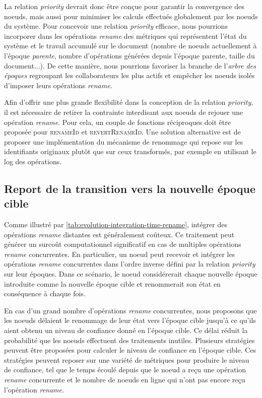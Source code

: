 \documentclass[12pt]{thesul}
\begin{document}
La relation \emph{priority} devrait donc être conçue pour garantir la convergence des noeuds, mais aussi pour minimiser les calculs effectués globalement par les noeuds du système.
Pour concevoir une relation \emph{priority} efficace, nous pourrions incorporer dans les opérations \emph{rename} des métriques qui représentent l'état du système et le travail accumulé sur le document (nombre de noeuds actuellement à l'époque \emph{parente}, nombre d'opérations générées depuis l'époque parente, taille du document...).
De cette manière, nous pourrions favoriser la branche de l'\emph{arbre des époques} regroupant les collaborateurs les plus actifs et empêcher les noeuds isolés d'imposer leurs opérations \emph{rename}.

Afin d'offrir une plus grande flexibilité dans la conception de la relation \emph{priority}, il est nécessaire de retirer la contrainte interdisant aux noeuds de rejouer une opération \emph{rename}.
Pour cela, un couple de fonctions réciproques doit être proposée pour \textsc{renameId} et \textsc{revertRenameId}.
Une solution alternative est de proposer une implémentation du mécanisme de renommage qui repose sur les identifiants originaux plutôt que sur ceux transformés, par exemple en utilisant le log des opérations.

\subsection{Report de la transition vers la nouvelle époque cible}

\label{sec:report-transition-to-target-epoch}

Comme illustré par \autoref{tab:evolution-integration-time-rename}, intégrer des opérations \emph{rename} distantes est généralement coûteux.
Ce traitement peut générer un surcoût computationnel significatif en cas de multiples opérations \emph{rename} concurrentes.
En particulier, un noeud peut recevoir et intégrer les opérations \emph{rename} concurrentes dans l'ordre inverse défini par la relation \emph{priority} sur leur époques.
Dans ce scénario, le noeud considérerait chaque nouvelle époque introduite comme la nouvelle époque cible et renommerait son état en conséquence à chaque fois.


En cas d'un grand nombre d'opérations \emph{rename} concurrentes, nous proposons que les noeuds délaient le renommage de leur état vers l'époque cible jusqu'à ce qu'ils aient obtenu un niveau de confiance donné en l'époque cible.
Ce délai réduit la probabilité que les noeuds effectuent des traitements inutiles.
Plusieurs stratégies peuvent être proposées pour calculer le niveau de confiance en l'époque cible.
Ces stratégies peuvent reposer sur une variété de métriques pour produire le niveau de confiance, tel que le temps écoulé depuis que le noeud a reçu une opération \emph{rename} concurrente et le nombre de noeuds en ligne qui n'ont pas encore reçu l'opération \emph{rename}.
\end{document}
